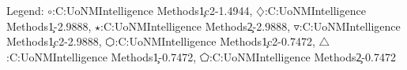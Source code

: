 Legend: {\color{NavyBlue}$\circ$}:C:\University\Undergraduate UoNM\Artificial Intelligence Methods\CW\data\c1c2-1.4944, {\color{Magenta}$\diamondsuit$}:C:\University\Undergraduate UoNM\Artificial Intelligence Methods\CW\data\c1-2.9888, {\color{Orange}$\star$}:C:\University\Undergraduate UoNM\Artificial Intelligence Methods\CW\data\c2-2.9888, {\color{CornflowerBlue}$\triangledown$}:C:\University\Undergraduate UoNM\Artificial Intelligence Methods\CW\data\c1c2-2.9888, {\color{red}$\varhexagon$}:C:\University\Undergraduate UoNM\Artificial Intelligence Methods\CW\data\c1c2-0.7472, {\color{YellowGreen}$\triangle$}:C:\University\Undergraduate UoNM\Artificial Intelligence Methods\CW\data\c1-0.7472, {\color{cyan}$\pentagon$}:C:\University\Undergraduate UoNM\Artificial Intelligence Methods\CW\data\c2-0.7472